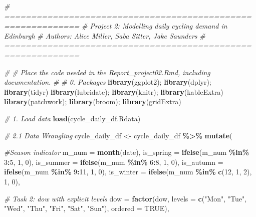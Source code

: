 \documentclass[
]{article}
\newenvironment{Shaded}{\begin{snugshade}}{\end{snugshade}}
\newcommand{\AttributeTok}[1]{\textcolor[rgb]{0.13,0.29,0.53}{#1}}
\newcommand{\CommentTok}[1]{\textcolor[rgb]{0.56,0.35,0.01}{\textit{#1}}}
\newcommand{\ConstantTok}[1]{\textcolor[rgb]{0.56,0.35,0.01}{#1}}
\newcommand{\DecValTok}[1]{\textcolor[rgb]{0.00,0.00,0.81}{#1}}
\newcommand{\FunctionTok}[1]{\textcolor[rgb]{0.13,0.29,0.53}{\textbf{#1}}}
\newcommand{\NormalTok}[1]{#1}
\newcommand{\OtherTok}[1]{\textcolor[rgb]{0.56,0.35,0.01}{#1}}
\newcommand{\SpecialCharTok}[1]{\textcolor[rgb]{0.81,0.36,0.00}{\textbf{#1}}}
\newcommand{\StringTok}[1]{\textcolor[rgb]{0.31,0.60,0.02}{#1}}
\begin{document}
\begin{Shaded}
\begin{Highlighting}[]
\CommentTok{\# ============================================================}
\CommentTok{\# Project 2: Modelling daily cycling demand in Edinburgh}
\CommentTok{\# Authors: Alice Miller, Saba Sitter, Jake Saunders}
\CommentTok{\# ============================================================}

\CommentTok{\#}
\CommentTok{\# Place the code needed in the Report\_project02.Rmd, including documentation.}
\CommentTok{\#}
\CommentTok{\# 0. Packages}
\FunctionTok{library}\NormalTok{(ggplot2); }\FunctionTok{library}\NormalTok{(dplyr); }\FunctionTok{library}\NormalTok{(tidyr)}
\FunctionTok{library}\NormalTok{(lubridate); }\FunctionTok{library}\NormalTok{(knitr); }\FunctionTok{library}\NormalTok{(kableExtra)}
\FunctionTok{library}\NormalTok{(patchwork); }\FunctionTok{library}\NormalTok{(broom); }\FunctionTok{library}\NormalTok{(gridExtra)}

\CommentTok{\# 1. Load data}
\FunctionTok{load}\NormalTok{(}\StringTok{\textquotesingle{}cycle\_daily\_df.Rdata\textquotesingle{}}\NormalTok{)}

\CommentTok{\# 2.1 Data Wrangling }
\NormalTok{cycle\_daily\_df }\OtherTok{\textless{}{-}}\NormalTok{ cycle\_daily\_df }\SpecialCharTok{\%\textgreater{}\%}
  \FunctionTok{mutate}\NormalTok{(}
    
    \CommentTok{\#Season indicator}
    \AttributeTok{m\_num =} \FunctionTok{month}\NormalTok{(date),}
    \AttributeTok{is\_spring =} \FunctionTok{ifelse}\NormalTok{(m\_num }\SpecialCharTok{\%in\%} \DecValTok{3}\SpecialCharTok{:}\DecValTok{5}\NormalTok{, }\DecValTok{1}\NormalTok{, }\DecValTok{0}\NormalTok{),}
    \AttributeTok{is\_summer =} \FunctionTok{ifelse}\NormalTok{(m\_num }\SpecialCharTok{\%in\%} \DecValTok{6}\SpecialCharTok{:}\DecValTok{8}\NormalTok{, }\DecValTok{1}\NormalTok{, }\DecValTok{0}\NormalTok{),}
    \AttributeTok{is\_autumn =} \FunctionTok{ifelse}\NormalTok{(m\_num }\SpecialCharTok{\%in\%} \DecValTok{9}\SpecialCharTok{:}\DecValTok{11}\NormalTok{, }\DecValTok{1}\NormalTok{, }\DecValTok{0}\NormalTok{),}
    \AttributeTok{is\_winter =} \FunctionTok{ifelse}\NormalTok{(m\_num }\SpecialCharTok{\%in\%} \FunctionTok{c}\NormalTok{(}\DecValTok{12}\NormalTok{, }\DecValTok{1}\NormalTok{, }\DecValTok{2}\NormalTok{), }\DecValTok{1}\NormalTok{, }\DecValTok{0}\NormalTok{),}
    
    \CommentTok{\# Task 2: dow with explicit levels }
    \AttributeTok{dow =} \FunctionTok{factor}\NormalTok{(dow,}
                 \AttributeTok{levels =} \FunctionTok{c}\NormalTok{(}\StringTok{"Mon"}\NormalTok{, }\StringTok{"Tue"}\NormalTok{, }\StringTok{"Wed"}\NormalTok{, }\StringTok{"Thu"}\NormalTok{, }\StringTok{"Fri"}\NormalTok{, }\StringTok{"Sat"}\NormalTok{, }\StringTok{"Sun"}\NormalTok{), }
                 \AttributeTok{ordered =} \ConstantTok{TRUE}\NormalTok{),}
    

\end{Highlighting}
\end{Shaded}
\end{document}
